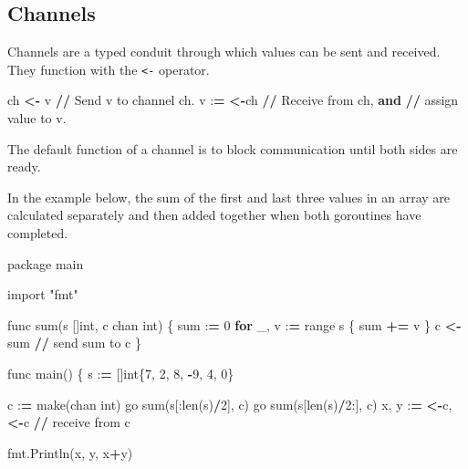 \documentclass[]{book}
\newenvironment{Shaded}{\begin{snugshade}}{\end{snugshade}}
\newcommand{\KeywordTok}[1]{\textcolor[rgb]{0.13,0.29,0.53}{\textbf{#1}}}
\newcommand{\DecValTok}[1]{\textcolor[rgb]{0.00,0.00,0.81}{#1}}
\newcommand{\StringTok}[1]{\textcolor[rgb]{0.31,0.60,0.02}{#1}}
\newcommand{\ImportTok}[1]{#1}
\newcommand{\ControlFlowTok}[1]{\textcolor[rgb]{0.13,0.29,0.53}{\textbf{#1}}}
\newcommand{\OperatorTok}[1]{\textcolor[rgb]{0.81,0.36,0.00}{\textbf{#1}}}
\newcommand{\BuiltInTok}[1]{#1}
\newcommand{\NormalTok}[1]{#1}
\begin{document}
\subsection{Channels}\label{channels}

Channels are a typed conduit through which values can be sent and
received. They function with the \texttt{\textless{}-} operator.

\begin{Shaded}
\begin{Highlighting}[]
\NormalTok{ch }\OperatorTok{<-}\NormalTok{ v    }\OperatorTok{//}\NormalTok{ Send v to channel ch.}
\NormalTok{v :}\OperatorTok{=} \OperatorTok{<-}\NormalTok{ch  }\OperatorTok{//}\NormalTok{ Receive }\ImportTok{from}\NormalTok{ ch, }\KeywordTok{and}
           \OperatorTok{//}\NormalTok{ assign value to v.}
\end{Highlighting}
\end{Shaded}

The default function of a channel is to block communication until both
sides are ready.

In the example below, the sum of the first and last three values in an
array are calculated separately and then added together when both
goroutines have completed.

\begin{Shaded}
\begin{Highlighting}[]
\NormalTok{package main}

\ImportTok{import} \StringTok{"fmt"}

\NormalTok{func }\BuiltInTok{sum}\NormalTok{(s []}\BuiltInTok{int}\NormalTok{, c chan }\BuiltInTok{int}\NormalTok{) \{}
    \BuiltInTok{sum}\NormalTok{ :}\OperatorTok{=} \DecValTok{0}
    \ControlFlowTok{for}\NormalTok{ _, v :}\OperatorTok{=} \BuiltInTok{range}\NormalTok{ s \{}
        \BuiltInTok{sum} \OperatorTok{+=}\NormalTok{ v}
\NormalTok{    \}}
\NormalTok{    c }\OperatorTok{<-} \BuiltInTok{sum} \OperatorTok{//}\NormalTok{ send }\BuiltInTok{sum}\NormalTok{ to c}
\NormalTok{\}}

\NormalTok{func main() \{}
\NormalTok{    s :}\OperatorTok{=}\NormalTok{ []}\BuiltInTok{int}\NormalTok{\{}\DecValTok{7}\NormalTok{, }\DecValTok{2}\NormalTok{, }\DecValTok{8}\NormalTok{, }\OperatorTok{-}\DecValTok{9}\NormalTok{, }\DecValTok{4}\NormalTok{, }\DecValTok{0}\NormalTok{\}}

\NormalTok{    c :}\OperatorTok{=}\NormalTok{ make(chan }\BuiltInTok{int}\NormalTok{)}
\NormalTok{    go }\BuiltInTok{sum}\NormalTok{(s[:}\BuiltInTok{len}\NormalTok{(s)}\OperatorTok{/}\DecValTok{2}\NormalTok{], c)}
\NormalTok{    go }\BuiltInTok{sum}\NormalTok{(s[}\BuiltInTok{len}\NormalTok{(s)}\OperatorTok{/}\DecValTok{2}\NormalTok{:], c)}
\NormalTok{    x, y :}\OperatorTok{=} \OperatorTok{<-}\NormalTok{c, }\OperatorTok{<-}\NormalTok{c }\OperatorTok{//}\NormalTok{ receive }\ImportTok{from}\NormalTok{ c}

\NormalTok{    fmt.Println(x, y, x}\OperatorTok{+}\NormalTok{y)}
\end{Highlighting}
\end{Shaded}
\end{document}
